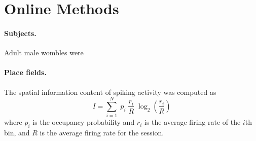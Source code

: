 
\section*{Online Methods}

\paragraph{Subjects.} 
Adult male wombles were \lipsum[8-9]

\paragraph{Place fields.}
The spatial information content\cite{SkagMcNa93a} of spiking activity was computed as
\begin{equation}
  I=\sum_{i=1}^{N} \; p_i \; \frac{r_i}{R} \; \log_2\left(\frac{r_i}{R}\right)
  \label{eq:skaggs}
\end{equation}
where $p_i$ is the occupancy probability and $r_i$ is the average firing rate of the $i$th bin, and $R$ is the average
firing rate for the session.

